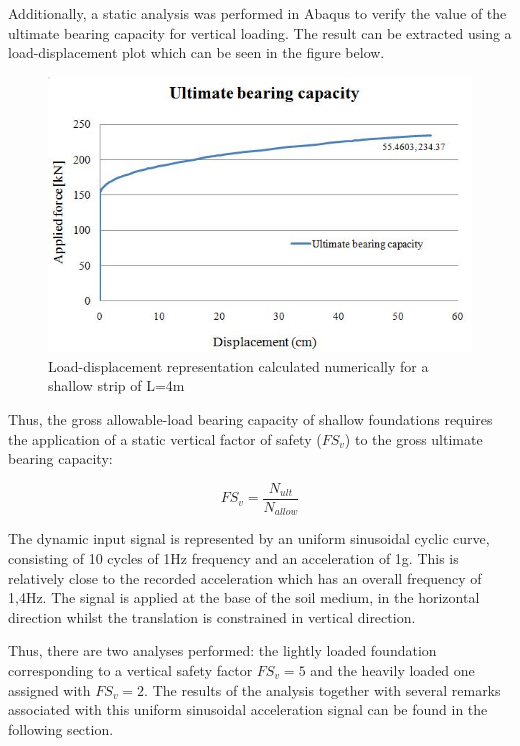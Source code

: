 	Additionally, a static analysis was performed in Abaqus to verify the value of the ultimate bearing capacity for vertical loading. The result can be extracted using a load-displacement plot which can be seen in the figure below.


		\begin{figure}[!h]
			\centering
			\includegraphics[width=0.5\linewidth]{"ultimatebearing"}
			\caption{Load-displacement representation calculated numerically for a shallow strip of L=4m}
			\label{bearing}
		\end{figure}

	Thus, the gross allowable-load bearing capacity of shallow foundations requires the application of a static vertical factor of safety ($FS_v$) to the gross ultimate bearing capacity:
	
\begin{equation}
	FS_v=\frac{N_{ult}}{N_{allow}}
\end{equation}

The dynamic input signal is represented by an uniform sinusoidal cyclic curve, consisting of 10 cycles of 1Hz frequency and an acceleration of 1g. This is relatively close to the recorded acceleration which has an overall frequency of 1,4Hz. The signal is applied at the base of the soil medium, in the horizontal direction whilst the translation is constrained in vertical direction.

Thus, there are two analyses performed: the lightly loaded foundation corresponding to a vertical safety factor $FS_v=5$ and the heavily loaded one assigned with $FS_v=2$. The results of the analysis together with several remarks associated with this uniform sinusoidal acceleration signal can be found in the following section.
	  
